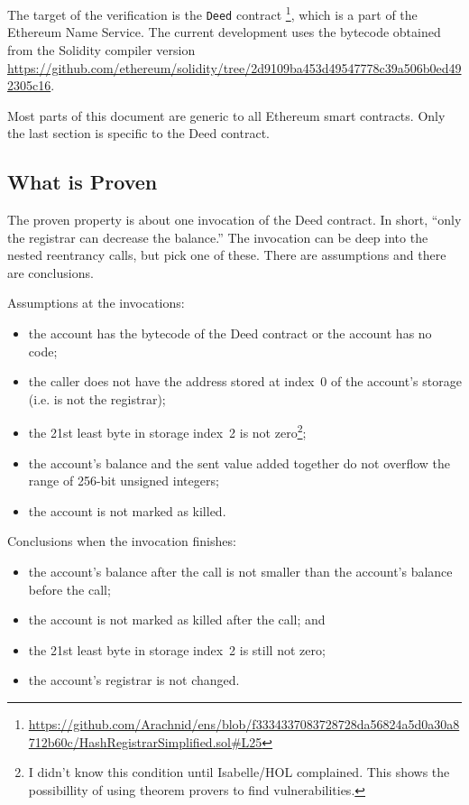 \documentclass[11pt,a4paper]{article}
\begin{document}
The target of the verification is the \texttt{Deed} contract%
\footnote{\url{https://github.com/Arachnid/ens/blob/f3334337083728728da56824a5d0a30a8712b60c/HashRegistrarSimplified.sol\#L25}},
which is a part of the Ethereum Name Service.
The current development uses the bytecode obtained from the
Solidity compiler version \url{https://github.com/ethereum/solidity/tree/2d9109ba453d49547778c39a506b0ed492305c16}.

Most parts of this document are generic to all Ethereum smart
contracts.  Only the last section is specific to the Deed contract.

\subsection{What is Proven}

The proven property is about one invocation of the Deed contract.
In short, ``only the registrar can decrease the balance.''
The invocation can be deep into the nested reentrancy calls, but pick
one of these.
There are assumptions and there are conclusions.

Assumptions at the invocations:
\begin{itemize}
  \item the account has the bytecode of the Deed contract or the
    account has no code;
  \item the caller does not have the address stored at index~0 of the
    account's storage (i.e. is not the registrar);
  \item the 21st least byte in storage index~2 is not zero\footnote{I didn't know this condition until Isabelle/HOL complained.  This shows the possibillity of using theorem provers to find vulnerabilities.};
  \item the account's balance and the sent value added together do not
    overflow the range of 256-bit unsigned integers;
  \item the account is not marked as killed.
\end{itemize}

Conclusions when the invocation finishes:
\begin{itemize}
  \item the account's balance after the call is not smaller than the
    account's balance before the call;
  \item the account is not marked as killed after the call; and
  \item the 21st least byte in storage index~2 is still not zero;
  \item the account's registrar is not changed.
\end{itemize}
\end{document}
